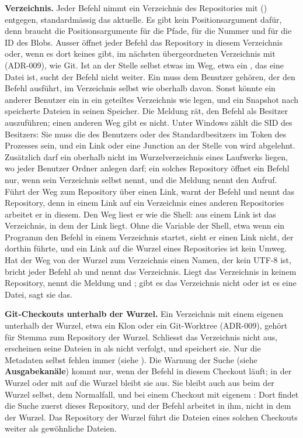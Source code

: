 {\bf Verzeichnis.} Jeder Befehl nimmt ein Verzeichnis des Repositories mit
 () entgegen, standardmässig das aktuelle. Es gibt kein
Positionsargument dafür, denn  braucht die Positionsargumente für die Pfade,
 für die Nummer und  für die ID des Blobs.
Ausser  öffnet jeder Befehl das Repository in diesem Verzeichnis oder, wenn es dort
keines gibt, im nächsten übergeordneten Verzeichnis mit  (ADR-009), wie Git.
Ist an der Stelle selbst etwas im Weg, etwa ein , das eine Datei ist, sucht der
Befehl nicht weiter. Ein  muss dem Benutzer gehören, der den Befehl
ausführt, im Verzeichnis selbst wie oberhalb davon. Sonst könnte ein anderer Benutzer ein
 in ein geteiltes Verzeichnis wie  legen, und ein Snapshot nach
 speicherte Dateien in seinen Speicher. Die Meldung rät, den Befehl als Besitzer
auszuführen; einen anderen Weg gibt es nicht. Unter Windows zählt die SID des Besitzers: Sie muss
die des Benutzers oder des Standardbesitzers im Token des Prozesses sein, und ein Link oder eine
Junction an der Stelle von  wird abgelehnt. Zusätzlich darf ein 
oberhalb nicht im Wurzelverzeichnis eines Laufwerks liegen, wo jeder Benutzer Ordner anlegen darf;
ein solches Repository öffnet ein Befehl nur, wenn  sein Verzeichnis selbst nennt,
und die Meldung nennt den Aufruf.
Führt der Weg zum Repository über einen Link, warnt der Befehl und nennt das Repository, denn
in einem Link auf ein Verzeichnis eines anderen Repositories arbeitet er in diesem.
Den Weg liest er wie die Shell:  aus einem
Link ist das Verzeichnis, in dem der Link liegt. Ohne die Variable  der Shell, etwa
wenn ein Programm den Befehl in einem Verzeichnis startet, sieht er einen Link nicht, der dorthin
führte, und ein Link auf die Wurzel eines Repositories ist kein Umweg. Hat der Weg von der Wurzel
zum Verzeichnis einen Namen, der kein UTF-8 ist, bricht jeder Befehl ab und nennt das Verzeichnis.
Liegt das Verzeichnis in keinem Repository,
nennt die Meldung  und ; gibt es das Verzeichnis nicht oder ist es
eine Datei, sagt sie das.

{\bf Git-Checkouts unterhalb der Wurzel.} Ein Verzeichnis mit einem eigenen 
unterhalb der Wurzel, etwa ein Klon oder ein Git-Worktree (ADR-009), gehört für Stemma zum
Repository der Wurzel. Schliesst  das Verzeichnis nicht aus,
erscheinen seine Dateien in  als nicht verfolgt,
und  speichert sie.
Nur die Metadaten  selbst fehlen immer (siehe ).
Die Warnung der Suche (siehe {\bf Ausgabekanäle}) kommt nur,
wenn der Befehl in diesem Checkout läuft; in der Wurzel
oder mit  auf die Wurzel bleibt sie aus.
Sie bleibt auch aus beim  der Wurzel selbst, dem Normalfall, und bei einem Checkout
mit eigenem : Dort findet die Suche zuerst dieses Repository, und der Befehl
arbeitet in ihm, nicht in dem der Wurzel. Das Repository der Wurzel führt die Dateien eines
solchen Checkouts weiter als gewöhnliche Dateien.

